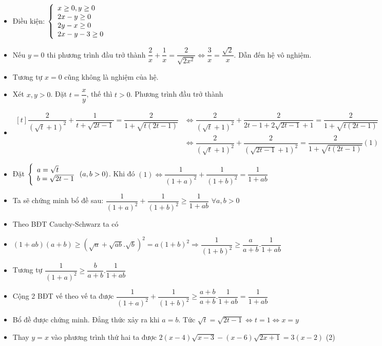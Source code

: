 \lgi 
\begin{itemize}[leftmargin=*,label=]
\item Điều kiện: $\left\{\begin{array}{ll}x\ge 0, y \ge 0 \\ 2x-y\ge 0 \\ 2y-x \ge 0 \\ 2x-y-3\ge 0\end{array}\right.$
\item Nếu $y=0$ thi phương trình đầu trở thành $\dfrac{2}{x}+\dfrac{1}{x}=\dfrac{2}{\sqrt{2x^2}}\Leftrightarrow \dfrac{3}{x}=\dfrac{\sqrt{2}}{x}$. Dẫn đến hệ vô nghiệm.
\item Tương tự $x=0$ cũng không là nghiệm của hệ. 
\item Xét $x,y>0$. Đặt $t=\dfrac{x}{y}$, thế thì $t>0$. Phương trình đầu trở thành
\item $\begin{aligned}[t] 
\dfrac{2}{(\sqrt{t}+1)^2}+\dfrac{1}{t+\sqrt{2t-1}}=\dfrac{2}{1+\sqrt{t(2t-1)}} &\Leftrightarrow \dfrac{2}{(\sqrt{t}+1)^2}+\dfrac{2}{2t-1+2\sqrt{2t-1}+1}=\dfrac{2}{1+\sqrt{t(2t-1)}}\\
&\Leftrightarrow \dfrac{2}{(\sqrt{t}+1)^2}+\dfrac{2}{(\sqrt{2t-1}+1)^2}=\dfrac{2}{1+\sqrt{t(2t-1)}} (1)
\end{aligned}$
\item Đặt $\left\{\begin{array}{ll}a=\sqrt{t}\\ b=\sqrt{2t-1}\end{array}\right. (a,b>0)$. Khi đó $(1)\Leftrightarrow \dfrac{1}{(1+a)^2}+\dfrac{1}{(1+b)^2}=\dfrac{1}{1+ab}$
\item Ta sẽ chứng minh bổ đề sau: $\dfrac{1}{(1+a)^2}+\dfrac{1}{(1+b)^2}\ge \dfrac{1}{1+ab}$ $\forall a,b>0$
\item Theo BĐT Cauchy-Schwarz ta có 
\item $(1+ab)(a+b)\ge (\sqrt{a}+\sqrt{ab}.\sqrt{b})^2=a(1+b)^2\Rightarrow \dfrac{1}{(1+b)^2}\ge \dfrac{a}{a+b}.\dfrac{1}{1+ab}$
\item Tương tự $\dfrac{1}{(1+a)^2}\ge \dfrac{b}{a+b}.\dfrac{1}{1+ab}$
\item Cộng 2 BĐT vế theo vế ta được $\dfrac{1}{(1+a)^2}+\dfrac{1}{(1+b)^2} \ge \dfrac{a+b}{a+b}.\dfrac{1}{1+ab}=\dfrac{1}{1+ab}$
\item Bổ đề được chứng minh. Đẳng thức xảy ra khi $a=b$. Tức $\sqrt{t}=\sqrt{2t-1}\Leftrightarrow t=1\Leftrightarrow x=y$
\item Thay $y=x$ vào phương trình thứ hai ta được $2(x-4)\sqrt{x-3}-(x-6)\sqrt{2x+1}=3(x-2)$ (2)
\end{itemize}



